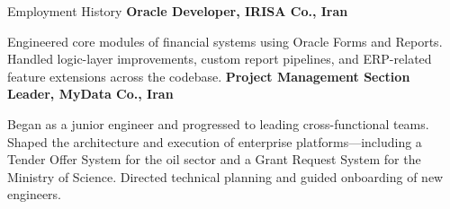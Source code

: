 \begin{rubric}{Employment History}
%
	\textbf{Oracle Developer, IRISA Co., Iran}\par
	Engineered core modules of financial systems using Oracle Forms and Reports. Handled logic-layer improvements, custom report pipelines, and ERP-related feature extensions across the codebase.
%
	\textbf{Project Management Section Leader, MyData Co., Iran}\par
	Began as a junior engineer and progressed to leading cross-functional teams. Shaped the architecture and execution of enterprise platforms—including a Tender Offer System for the oil sector and a Grant Request System for the Ministry of Science. Directed technical planning and guided onboarding of new engineers.
\end{rubric}
